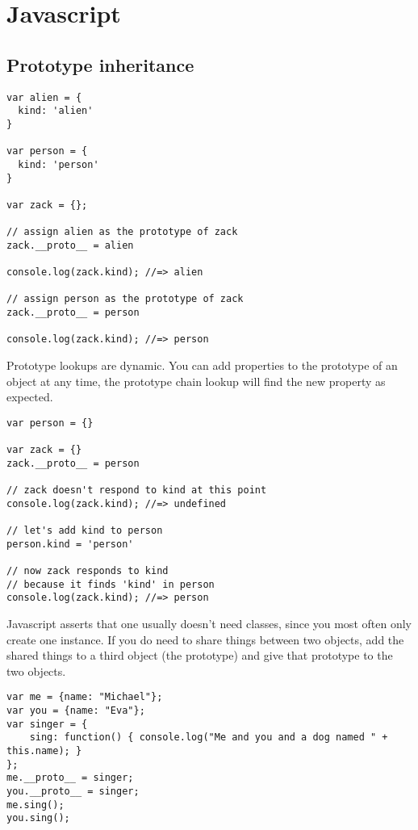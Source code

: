 \section{Javascript}



\subsection{Prototype inheritance}

\begin{lstlisting}
var alien = {
  kind: 'alien'
}

var person = {
  kind: 'person'
}

var zack = {};

// assign alien as the prototype of zack
zack.__proto__ = alien

console.log(zack.kind); //=> alien

// assign person as the prototype of zack
zack.__proto__ = person

console.log(zack.kind); //=> person   
\end{lstlisting}

Prototype lookups are dynamic. You can add properties to the prototype of an object at any time, the prototype chain lookup will find the new property as expected.

\begin{lstlisting}
var person = {}

var zack = {}
zack.__proto__ = person

// zack doesn't respond to kind at this point
console.log(zack.kind); //=> undefined

// let's add kind to person
person.kind = 'person'

// now zack responds to kind
// because it finds 'kind' in person
console.log(zack.kind); //=> person
\end{lstlisting}

Javascript asserts that one usually doesn't need classes, since you most often only create one instance. If you do need to share things between two objects, add the shared things to a third object (the prototype) and give that prototype to the two objects. 

\begin{lstlisting}
var me = {name: "Michael"};
var you = {name: "Eva"};
var singer = { 
    sing: function() { console.log("Me and you and a dog named " + this.name); } 
};
me.__proto__ = singer;
you.__proto__ = singer;
me.sing();
you.sing();
\end{lstlisting}

